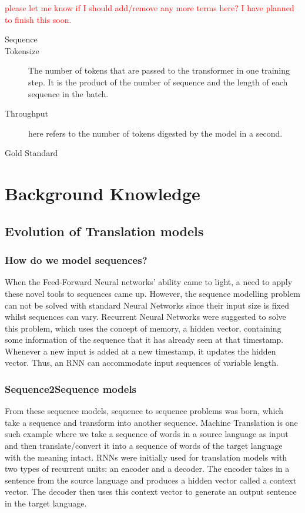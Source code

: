 \documentclass[12pt,a4paper,twoside,openright]{report}
\newcommand{\red}[1]{\textcolor{red}{#1}}
\begin{document}
\red{please let me know if I should add/remove any more terms here? I have planned to finish this soon.}

\begin{description}
    \item[Sequence]
    \item[Tokensize] The number of tokens that are passed to the transformer in one training step. It is the product of the number of sequence and the length of each sequence in the batch.
    \item[Throughput] here refers to the number of tokens digested by the model in a second.
    \item[Gold Standard]
\end{description}



\section{Background Knowledge}
\label{background}

\subsection{Evolution of Translation models}
\label{evolution}

\subsubsection{How do we model sequences?}
When the Feed-Forward Neural networks' ability came to light, a need to apply these novel tools to sequences came up. However, the sequence modelling problem can not be solved with standard Neural Networks since their input size is fixed whilst sequences can vary. Recurrent Neural Networks were suggested to solve this problem, which uses the concept of memory, a hidden vector, containing some information of the sequence that it has already seen at that timestamp. Whenever a new input is added at a new timestamp, it updates the hidden vector. Thus, an RNN can accommodate input sequences of variable length.

\subsubsection{Sequence2Sequence models}
From these sequence models, sequence to sequence problems was born, which take a sequence and transform into another sequence. Machine Translation is one such example where we take a sequence of words in a source language as input and then translate/convert it into a sequence of words of the target language with the meaning intact. RNNs were initially used for translation models with two types of recurrent units: an encoder and a decoder. The encoder takes in a sentence from the source language and produces a hidden vector called a context vector. The decoder then uses this context vector to generate an output sentence in the target language.
\end{document}
